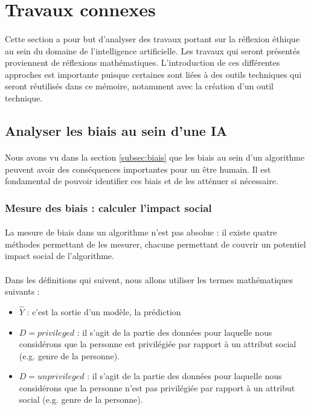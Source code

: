 \documentclass[10pt, french, a4paper]{report}
\begin{document}
\section{Travaux connexes}
\label{sec:travaux}

\paragraph{}
Cette section a pour but d’analyser des travaux portant sur la réflexion éthique au sein du domaine de l’intelligence artificielle. Les travaux qui seront présentés proviennent de réflexions mathématiques. L’introduction de ces différentes approches est importante puisque certaines sont liées à des outils techniques qui seront réutilisés dans ce mémoire, notamment avec la création d’un outil technique.

\subsection{Analyser les biais au sein d'une IA}

\paragraph{}
Nous avons vu dans la section \ref{subsec:biais} que les biais au sein d'un algorithme peuvent avoir des conséquences importantes pour un être humain. Il est fondamental de pouvoir identifier ces biais et de les atténuer si nécessaire. 

\subsubsection{Mesure des biais : calculer l'impact social}
\label{subsec:mesures_biais}

\paragraph{}
La mesure de biais dans un algorithme n'est pas absolue : il existe quatre méthodes permettant de les mesurer, chacune permettant de couvrir un potentiel impact social de l'algorithme.

\paragraph{}
Dans les définitions qui suivent, nous allons utiliser les termes mathématiques suivants :

\begin{itemize}
  \item $\hat{Y}$ : c'est la sortie d'un modèle, la prédiction
  \item $D = privileged$ : il s'agit de la partie des données pour laquelle nous considérons que la personne est privilégiée par rapport à un attribut social (e.g. genre de la personne).
  \item $D = unprivileged$ : il s'agit de la partie des données pour laquelle nous considérons que la personne n'est pas privilégiée par rapport à un attribut social (e.g. genre de la personne).
\end{itemize}
\end{document}
